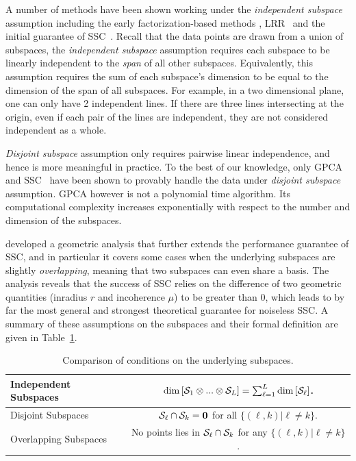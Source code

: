 \documentclass{ctexart}
\begin{document}
A number of methods have been shown working under the \emph{independent subspace} assumption including the early factorization-based methods \cite{costeira1998motion_seg,kanatani2001motion}, LRR~\cite{liu2010lrr_icml} and the initial guarantee of SSC~\cite{elhamifar2009ssc}. Recall that the data points are drawn from a union of subspaces, the \emph{independent subspace } assumption requires each subspace to be linearly independent to the {\em span} of all other subspaces. Equivalently, this assumption requires the sum of each subspace's dimension to be equal to the dimension of the span of all subspaces. For example, in a two dimensional plane, one can only have 2 independent lines. If there are three lines intersecting at the origin, even if each pair of the lines are independent, they are not considered independent as a whole.

\emph{Disjoint subspace} assumption only requires pairwise linear independence, and hence is more meaningful in practice. To the best of our knowledge, only GPCA~\cite{vidal2005gpca} and SSC~\cite{elhamifar2010ssc_icassp,elhamifar2012ssc_journal} have been shown to provably handle the data under \emph{disjoint subspace} assumption. GPCA however is not a polynomial time algorithm. Its computational complexity increases exponentially with respect to the number and dimension of the subspaces.

\cite{soltanolkotabi2011geometric} developed a geometric analysis that further extends the performance guarantee of SSC, and in particular it covers some cases when the underlying subspaces are slightly \emph{overlapping}, meaning that two subspaces can even share a basis. The analysis reveals that the success of SSC relies on the difference of two geometric quantities (inradius $r$ and incoherence $\mu$) to be greater than $0$, which leads to by far the most general and strongest theoretical guarantee for noiseless SSC. A summary of these assumptions on the subspaces and their formal definition are given in Table~\ref{tab:subspaces}.
\begin{table}
  \centering
\begin{tabular}{|l|c|}
  \hline
  Independent Subspaces & $\mathrm{dim}\left[\mathcal{S}_1\otimes...\otimes \mathcal{S}_L\right] = \sum_{\ell=1}^L \mathrm{dim}\left[\mathcal{S}_\ell\right]  $.  \\\hline
  Disjoint Subspaces &  $\mathcal{S}_\ell\cap \mathcal{S}_k =\mathbf{0}$ for all $\{(\ell,k)|\ell\neq k\}$.\\\hline
  Overlapping Subspaces & No points lies in $\mathcal{S}_\ell\cap \mathcal{S}_k$ for any $\{(\ell,k)|\ell\neq k\}$.\\
  \hline
\end{tabular}
\caption{Comparison of conditions on the underlying subspaces.}\label{tab:subspaces}
\end{table}
\end{document}
